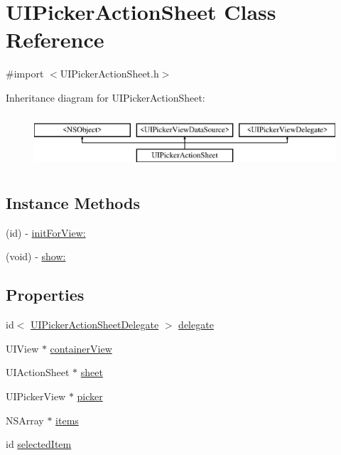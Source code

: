 \hypertarget{interface_u_i_picker_action_sheet}{\section{U\-I\-Picker\-Action\-Sheet Class Reference}
\label{interface_u_i_picker_action_sheet}
}


{\ttfamily \#import $<$U\-I\-Picker\-Action\-Sheet.\-h$>$}

Inheritance diagram for U\-I\-Picker\-Action\-Sheet\-:\begin{figure}[H]
\begin{center}
\leavevmode
\includegraphics[height=2.000000cm]{interface_u_i_picker_action_sheet}
\end{center}
\end{figure}
\subsection*{Instance Methods}
\begin{DoxyCompactItemize}
\item 
(id) -\/ \hyperlink{interface_u_i_picker_action_sheet_a55297c75294f31a445a6dcac546941a9}{init\-For\-View\-:}
\item 
(void) -\/ \hyperlink{interface_u_i_picker_action_sheet_a0c7ba3e6826ba4e438fea89d48542c09}{show\-:}
\end{DoxyCompactItemize}
\subsection*{Properties}
\begin{DoxyCompactItemize}
\item 
id$<$ \hyperlink{protocol_u_i_picker_action_sheet_delegate-p}{U\-I\-Picker\-Action\-Sheet\-Delegate} $>$ \hyperlink{interface_u_i_picker_action_sheet_a322a2a2f827adbecbe50a56915e3e83c}{delegate}
\item 
U\-I\-View $\ast$ \hyperlink{interface_u_i_picker_action_sheet_a0fc6fa5c94cc4d73bdeeec14d4b428c8}{container\-View}
\item 
U\-I\-Action\-Sheet $\ast$ \hyperlink{interface_u_i_picker_action_sheet_a503101d9ef2e420fa163f601e1a2395e}{sheet}
\item 
U\-I\-Picker\-View $\ast$ \hyperlink{interface_u_i_picker_action_sheet_a25afb86f0d9ba310defc06e79d7288e6}{picker}
\item 
N\-S\-Array $\ast$ \hyperlink{interface_u_i_picker_action_sheet_a89ee574615afe8a3270aa1586fdf3a3e}{items}
\item 
id \hyperlink{interface_u_i_picker_action_sheet_a918f026bb6b62e4f1d6cc692f76221db}{selected\-Item}
\end{DoxyCompactItemize}


